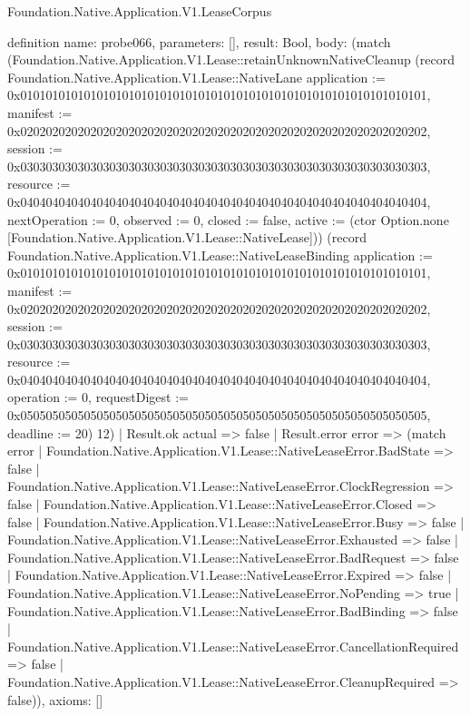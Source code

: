 \begin{lexlean}{Foundation.Native.Application.V1.LeaseCorpus}
\begin{semanticmodule}
definition{
  name: probe066,
  parameters: [],
  result: Bool,
  body: (match (Foundation.Native.Application.V1.Lease::retainUnknownNativeCleanup (record Foundation.Native.Application.V1.Lease::NativeLane {application := 0x0101010101010101010101010101010101010101010101010101010101010101, manifest := 0x0202020202020202020202020202020202020202020202020202020202020202, session := 0x0303030303030303030303030303030303030303030303030303030303030303, resource := 0x0404040404040404040404040404040404040404040404040404040404040404, nextOperation := 0, observed := 0, closed := false, active := (ctor Option.none [Foundation.Native.Application.V1.Lease::NativeLease])}) (record Foundation.Native.Application.V1.Lease::NativeLeaseBinding {application := 0x0101010101010101010101010101010101010101010101010101010101010101, manifest := 0x0202020202020202020202020202020202020202020202020202020202020202, session := 0x0303030303030303030303030303030303030303030303030303030303030303, resource := 0x0404040404040404040404040404040404040404040404040404040404040404, operation := 0, requestDigest := 0x0505050505050505050505050505050505050505050505050505050505050505, deadline := 20}) 12)
    | Result.ok actual => false
    | Result.error error => (match error
      | Foundation.Native.Application.V1.Lease::NativeLeaseError.BadState => false
      | Foundation.Native.Application.V1.Lease::NativeLeaseError.ClockRegression => false
      | Foundation.Native.Application.V1.Lease::NativeLeaseError.Closed => false
      | Foundation.Native.Application.V1.Lease::NativeLeaseError.Busy => false
      | Foundation.Native.Application.V1.Lease::NativeLeaseError.Exhausted => false
      | Foundation.Native.Application.V1.Lease::NativeLeaseError.BadRequest => false
      | Foundation.Native.Application.V1.Lease::NativeLeaseError.Expired => false
      | Foundation.Native.Application.V1.Lease::NativeLeaseError.NoPending => true
      | Foundation.Native.Application.V1.Lease::NativeLeaseError.BadBinding => false
      | Foundation.Native.Application.V1.Lease::NativeLeaseError.CancellationRequired => false
      | Foundation.Native.Application.V1.Lease::NativeLeaseError.CleanupRequired => false)),
  axioms: []
}


\end{semanticmodule}
\end{lexlean}
